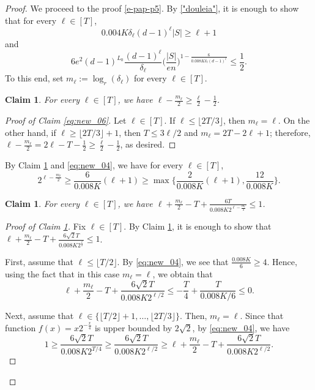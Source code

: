 \documentclass[11pt,leqno]{amsart}
\newtheorem{claim}[theorem]{Claim}
\theoremstyle{remark}
\theoremstyle{plain}
\begin{document}
\begin{proof}
We proceed to the proof \eqref{e-pap-p5}. By \eqref{"douleia"}, it is enough to show that for every $\ell\in[T]$,
\begin{equation} \label{eq:new_05}
0.004 K \delta_\ell (d-1)^\ell |S|\geqslant \ell+1
\end{equation}
and
\begin{equation} \label{eq:new_06}
6e^2(d-1)^{L_0}\frac{(d-1)^\ell}{\delta_\ell} \Big(\frac{|S|}{en}\Big)^{1-\frac{6}{0.008 K \delta_\ell (d-1)^\ell}}
\leqslant\frac{1}{2}.
\end{equation}
To this end, set $m_\ell:= \log_{r}(\delta_\ell)$ for every $\ell\in[T]$.
\begin{claim}\label{claim_new_1}
 For every $\ell\in[T]$, we have $\ell - \frac{m_\ell}{2}\geqslant \frac{\ell}{2}-\frac{1}{2}$.
\end{claim}
\begin{proof}[Proof of Claim \ref{eq:new_06}]
Let $\ell\in[T]$. If $\ell\leqslant\lfloor 2T/3\rfloor$, then $m_\ell = \ell$. On the other hand,
if $\ell \geqslant \lfloor 2T/3\rfloor+1$, then $T\leqslant 3\ell/2$ and $m_\ell = 2T -2\ell +1$;
therefore, $\ell - \frac{m_\ell}{2} = 2\ell-T-\frac{1}{2}\geqslant \frac{\ell}{2}-\frac{1}{2}$, as desired.
\end{proof}
By Claim \ref{claim_new_1} and  \eqref{eq:new_04}, we have for every $\ell\in [T]$,
\begin{equation} \label{"douleia2"}
2^{\ell - \frac{m_\ell}{2}}\geqslant \frac{6}{0.008 K}(\ell+1)
\geqslant \max\Big\{ \frac{2}{0.008 K}(\ell+1), \frac{12}{0.008 K}\Big\}.
\end{equation}
\begin{claim}\label{claim_new_3}
For every $\ell\in[T]$, we have $\ell + \frac{m_\ell}{2} - T +\frac{6T}{0.008 K 2^{\ell-\frac{m_\ell}{2}}}\leqslant1$.
\end{claim}
\begin{proof}[Proof of Claim \ref{claim_new_3}]
Fix $\ell\in[T]$. By Claim \ref{claim_new_1}, it is enough to show that $\ell + \frac{m_\ell}{2} - T +\frac{6\sqrt{2}T}{0.008 K 2^{\frac{\ell}{2}}}\leqslant1$.

First, assume that $\ell \leqslant \lfloor T/2 \rfloor$. By \eqref{eq:new_04}, we see that $\frac{0.008K}{6}\geqslant 4$. Hence, using the fact that in this case $m_\ell=\ell$, we obtain that
\[ \ell + \frac{m_\ell}{2} - T +\frac{6\sqrt{2}T}{0.008 K 2^{\ell/2}}\leqslant-\frac{T}{4} + \frac{T}{0.008 K/6 }\leqslant0.\]

Next, assume that $\ell\in\{\lfloor T/2\rfloor+1,\dots,\lfloor2T/3\rfloor\}$. Then, $m_\ell = \ell$.
Since that function $f(x)=x2^{-\frac{x}{4}}$ is upper bounded by $2\sqrt{2}$, by \eqref{eq:new_04}, we have
\[ 1\geqslant \frac{6\sqrt{2}T}{0.008 K 2^{T/4}} \geqslant \frac{6\sqrt{2}T}{0.008 K 2^{\ell/2}}
\geqslant \ell +\frac{m_\ell}{2} -T + \frac{6\sqrt{2}T}{0.008 K 2^{\ell/2}}. \]


\end{proof}
\end{proof}
\end{document}
